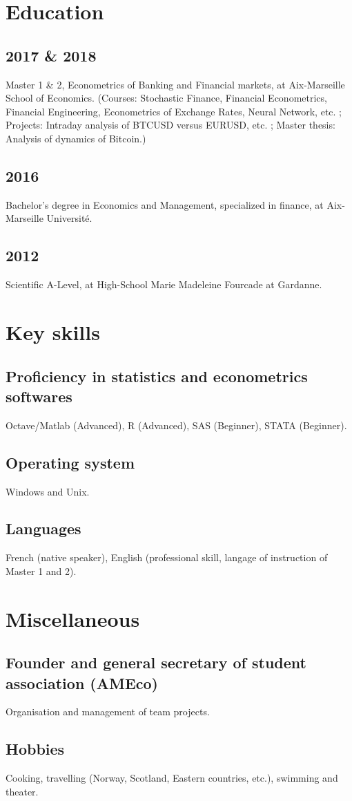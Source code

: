 \documentclass[a4paper,11pt]{arthur-cv}
\begin{document}
\begin{textblock}{20.5}
\begin{minipage}[t]{0.62\textwidth}
    \section{Education}
      \subsection{2017 \& 2018}{Master 1 \& 2, Econometrics of Banking and Financial markets, at Aix-Marseille School of Economics. (Courses: Stochastic Finance, Financial Econometrics, Financial Engineering, Econometrics of Exchange Rates, Neural Network, etc. ; Projects: Intraday analysis of BTCUSD versus EURUSD, etc. ; Master thesis: Analysis of dynamics of Bitcoin.)}
      \subsection{2016}{Bachelor’s degree in Economics and Management, specialized in finance, at Aix-Marseille Université.}
      \subsection{2012}{Scientific A-Level, at High-School Marie Madeleine Fourcade at Gardanne.}

    \section{Key skills}
      \subsection{Proficiency in statistics and econometrics softwares}{Octave/Matlab (Advanced), R (Advanced), SAS (Beginner), STATA (Beginner).} 
      \subsection{Operating system}{Windows and Unix.}
      \subsection{Languages}{French (native speaker), English (professional skill, langage of instruction of Master 1 and 2).}

    \section{Miscellaneous}
      \subsection{Founder and general secretary of student association (AMEco)}{Organisation and management of team projects.}
      \subsection{Hobbies}{Cooking, travelling (Norway, Scotland, Eastern countries, etc.), swimming and theater.}

  \end{minipage}

\end{textblock}
\end{document}
